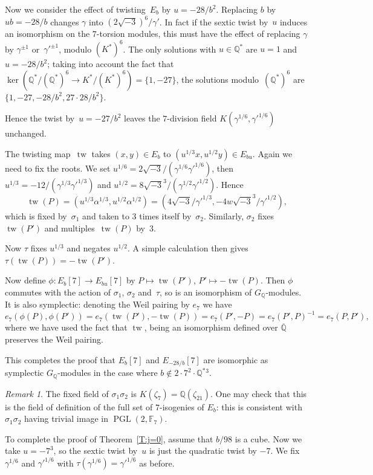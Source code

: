 \documentclass[12pt]{amsart}
\newcommand{\F}{\mathbb{F}}
\newcommand{\Q}{\mathbb{Q}}
\DeclareMathOperator{\tw}{tw}
\newcommand{\PGL}{\operatorname{PGL}}
\def\r3{\sqrt{-3}}
\numberwithin{equation}{section}
\theoremstyle{definition}
\theoremstyle{remark}
\newtheorem{remark}[theorem]{Remark}
\begin{document}
Now we consider the effect of twisting~$E_b$ by $u=-28/b^2$.
Replacing $b$ by $ub=-28/b$ changes $\gamma$ into $(2\r3)^6/\gamma'$.
In fact if the sextic twist by~$u$ induces an isomorphism on the
$7$-torsion modules, this must have the effect of replacing $\gamma$
by $\gamma^{\pm1}$ or~$\gamma'^{\pm1}$, modulo $(K^*)^6$.  The only
solutions with $u\in\Q^*$ are $u=1$ and $u=-28/b^2$; taking into
account the fact that $\ker(\Q^*/(\Q^*)^6\to K^*/(K^*)^6) =
\{1,-27\}$, the solutions modulo~$(\Q^*)^6$ are~$\{1,-27,-28/b^2,
27\cdot28/b^2\}$.

Hence the twist by~$u=-27/b^2$ leaves the $7$-division field
$K(\gamma^{1/6},\gamma'^{1/6})$ unchanged.

The twisting map~$\tw$ takes $(x,y)\in E_b$ to $(u^{1/3}x,u^{1/2}y)\in
E_{bu}$.  Again we need to fix the roots.  We set
$u^{1/6}=2\r3/(\gamma^{1/6}\gamma'^{1/6})$, then
$u^{1/3}=-12/(\gamma^{1/3}\gamma'^{1/3})$ and
$u^{1/2}=8\r3^3/(\gamma^{1/2}\gamma'^{1/2})$.  Hence
\[
 \tw(P) = (u^{1/3}\alpha^{1/3},u^{1/2}\alpha^{1/2}) =
(4\r3/\gamma'^{1/3},-4w\r3^3/\gamma'^{1/2}),
\]
which is fixed by~$\sigma_1$ and taken to $3$ times itself
by~$\sigma_2$.  Similarly, $\sigma_2$ fixes $\tw(P')$ and
multiples~$\tw(P)$ by~$3$.

Now $\tau$ fixes $u^{1/3}$ and negates $u^{1/2}$. A simple calculation
then gives $\tau(\tw(P)) = -\tw(P')$.

Now define $\phi: E_b[7] \to E_{bu}[7]$ by $P\mapsto\tw(P')$,
$P'\mapsto-\tw(P)$.  Then $\phi$ commutes with the action of
$\sigma_1$, $\sigma_2$ and~$\tau$, so is an isomorphism of
$G_\Q$-modules.  It is also symplectic:  denoting the Weil pairing by
$e_7$ we have
\[
e_7(\phi(P),\phi(P')) = e_7(\tw(P'),-\tw(P)) = e_7(P',-P) =
e_7(P',P)^{-1} = e_7(P,P'),
\]
where we have used the fact that $\tw$, being an isomorphism defined
over $\overline{\Q}$ preserves the Weil pairing.

This completes the proof that $E_b[7]$ and $E_{-28/b}[7]$ are
isomorphic as symplectic $G_{\Q}$-modules in the case where $b\notin
2\cdot7^2\cdot \Q^*{}^3$.


\begin{remark}
The fixed field of $\sigma_1\sigma_2$ is $K(\zeta_7)=\Q(\zeta_{21})$.
One may check that this is the field of definition of the full set of
$7$-isogenies of $E_b$: this is consistent with $\sigma_1\sigma_2$
having trivial image in $\PGL(2,\F_7)$.
\end{remark}

To complete the proof of Theorem~\ref{T:j=0}, assume that $b/98$ is a
cube.  Now we take $u=-7^3$, so the sextic twist by~$u$ is just the
quadratic twist by $-7$.  We fix $\gamma^{1/6}$ and $\gamma'^{1/6}$
with $\tau(\gamma^{1/6})=\gamma'^{1/6}$ as before.
\end{document}
